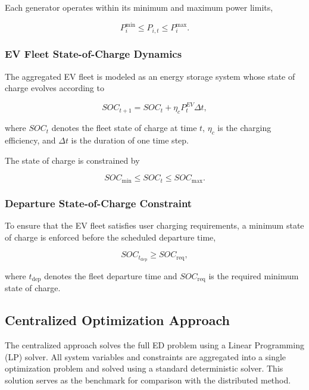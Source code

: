 \documentclass[12pt, a4paper]{article}
\begin{document}
Each generator operates within its minimum and maximum power limits,

\begin{equation}
P_i^{\min}
\le
P_{i,t}
\le
P_i^{\max}.
\end{equation}

\subsubsection*{EV Fleet State-of-Charge Dynamics}

The aggregated EV fleet is modeled as an energy storage system whose state of charge evolves according to

\begin{equation}
SOC_{t+1}
=
SOC_t
+
\eta_c P^{EV}_t \Delta t,
\end{equation}

where $SOC_t$ denotes the fleet state of charge at time $t$, $\eta_c$ is the charging efficiency, and $\Delta t$ is the duration of one time step.

The state of charge is constrained by

\begin{equation}
SOC_{\min}
\le
SOC_t
\le
SOC_{\max}.
\end{equation}

\subsubsection*{Departure State-of-Charge Constraint}

To ensure that the EV fleet satisfies user charging requirements, a minimum state of charge is enforced before the scheduled departure time,

\begin{equation}
SOC_{t_{\mathrm{dep}}}
\ge
SOC_{\mathrm{req}},
\end{equation}

where $t_{\mathrm{dep}}$ denotes the fleet departure time and $SOC_{\mathrm{req}}$ is the required minimum state of charge.

\subsection{Centralized Optimization Approach}

The centralized approach solves the full ED problem using a Linear Programming (LP) solver. All system variables and constraints are aggregated into a single optimization problem and solved using a standard deterministic solver. This solution serves as the benchmark for comparison with the distributed method.
\end{document}

